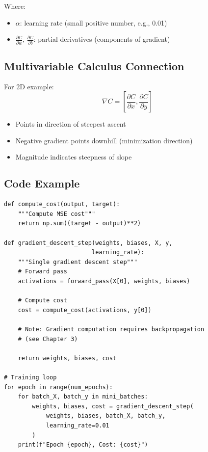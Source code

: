 \documentclass[11pt,a4paper]{article}
\begin{document}
Where:
\begin{itemize}
    \item $\alpha$: learning rate (small positive number, e.g., 0.01)
    \item $\frac{\partial C}{\partial w}$, $\frac{\partial C}{\partial b}$: partial derivatives (components of gradient)
\end{itemize}

\subsection{Multivariable Calculus Connection}
For 2D example:
\[
\nabla C = \left[\frac{\partial C}{\partial x}, \frac{\partial C}{\partial y}\right]
\]

\begin{itemize}
    \item Points in direction of steepest ascent
    \item Negative gradient points downhill (minimization direction)
    \item Magnitude indicates steepness of slope
\end{itemize}

\subsection{Code Example}
\begin{lstlisting}
def compute_cost(output, target):
    """Compute MSE cost"""
    return np.sum((target - output)**2)

def gradient_descent_step(weights, biases, X, y, 
                         learning_rate):
    """Single gradient descent step"""
    # Forward pass
    activations = forward_pass(X[0], weights, biases)
    
    # Compute cost
    cost = compute_cost(activations, y[0])
    
    # Note: Gradient computation requires backpropagation
    # (see Chapter 3)
    
    return weights, biases, cost

# Training loop
for epoch in range(num_epochs):
    for batch_X, batch_y in mini_batches:
        weights, biases, cost = gradient_descent_step(
            weights, biases, batch_X, batch_y, 
            learning_rate=0.01
        )
    print(f"Epoch {epoch}, Cost: {cost}")
\end{lstlisting}
\end{document}
